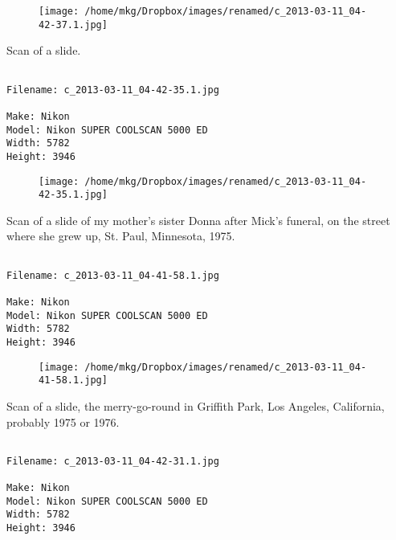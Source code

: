 \begin{figure}
\texttt{[image: /home/mkg/Dropbox/images/renamed/c\_2013-03-11\_04-42-37.1.jpg]}
\end{figure}
    
\clearpage
\onecolumn
\noindent Scan of a slide.
\noindent
\begin{lstlisting}

Filename: c_2013-03-11_04-42-35.1.jpg

Make: Nikon
Model: Nikon SUPER COOLSCAN 5000 ED
Width: 5782
Height: 3946
\end{lstlisting}
\clearpage

\begin{figure}
\texttt{[image: /home/mkg/Dropbox/images/renamed/c\_2013-03-11\_04-42-35.1.jpg]}
\end{figure}
    
\clearpage
\onecolumn
\noindent Scan of a slide of my mother's sister Donna after Mick's funeral, on the street where she grew up, St. Paul, Minnesota, 1975.
\noindent
\begin{lstlisting}

Filename: c_2013-03-11_04-41-58.1.jpg

Make: Nikon
Model: Nikon SUPER COOLSCAN 5000 ED
Width: 5782
Height: 3946
\end{lstlisting}
\clearpage

\begin{figure}
\texttt{[image: /home/mkg/Dropbox/images/renamed/c\_2013-03-11\_04-41-58.1.jpg]}
\end{figure}
    
\clearpage
\onecolumn
\noindent Scan of a slide, the merry-go-round in Griffith Park, Los Angeles, California, probably 1975 or 1976.
\noindent
\begin{lstlisting}

Filename: c_2013-03-11_04-42-31.1.jpg

Make: Nikon
Model: Nikon SUPER COOLSCAN 5000 ED
Width: 5782
Height: 3946
\end{lstlisting}
\clearpage

